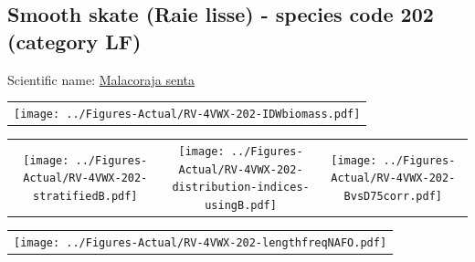 \documentclass[12pt]{article}\usepackage[]{graphicx}\usepackage[]{color}
\begin{document}
\renewcommand\thefigure{\thesubsection\Alph{figure}}

\setcounter{figure}{0}

\hypertarget{sec:202}{%
\subsection{Smooth skate (Raie lisse) - species code 202 (category LF)}\label{sec:202}}

  


Scientific name: \href{http://www.marinespecies.org/aphia.php?p=taxdetails\&id=158554}{Malacoraja senta} \newline
\begin{minipage}{1.0\textwidth}
 \begin{tabular}{c}
\texttt{[image: ../Figures-Actual/RV-4VWX-202-IDWbiomass.pdf]} \\ 
\end{tabular} 
\end{minipage}
\newline

\vspace{1cm}
\begin{minipage}{1.0\textwidth}
 \begin{tabular}{ccc}
\texttt{[image: ../Figures-Actual/RV-4VWX-202-stratifiedB.pdf]} & 
\texttt{[image: ../Figures-Actual/RV-4VWX-202-distribution-indices-usingB.pdf]} & 
\texttt{[image: ../Figures-Actual/RV-4VWX-202-BvsD75corr.pdf]} \\ 
\end{tabular} 
\end{minipage}
\clearpage
\begin{minipage}{1.0\textwidth}
 \begin{tabular}{c}
\texttt{[image: ../Figures-Actual/RV-4VWX-202-lengthfreqNAFO.pdf]} \\ 
\end{tabular} 
\end{minipage}
\newline
\end{document}

